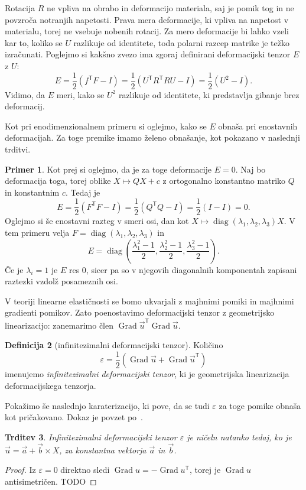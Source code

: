 \documentclass[12pt,a4paper,twoside]{article}
\theoremstyle{definition} %
\newtheorem{definicija}{Definicija}[section]
\newtheorem{primer}[definicija]{Primer}
\theoremstyle{plain} %
\newtheorem{trditev}[definicija]{Trditev}
\numberwithin{equation}{section}
\newcommand{\T}{\mathsf{T}}
\newcommand{\Grad}{\operatorname{Grad}}
\newcommand{\eps}{\varepsilon}
\newcommand{\vu}{\vec{u}}
\newcommand{\va}{\vec{a}}
\newcommand{\vb}{\vec{b}}
\newcommand{\vX}{X}
\DeclareMathOperator{\diag}{diag}
\begin{document}
Rotacija $R$ ne vpliva na obrabo in deformacijo materiala, saj je pomik tog in ne povzroča notranjih
napetosti. Prava mera deformacije, ki vpliva na napetost v materialu, torej ne vsebuje nobenih
rotacij. Za mero deformacije bi lahko vzeli kar to, koliko se $U$ razlikuje od identitete, toda
polarni razcep matrike je težko izračunati. Poglejmo si kakšno zvezo ima zgoraj definirani
deformacijski tenzor $E$ z $U$:
\[
  E = \frac12(f^\T F - I) = \frac12(U^\T R^\T R U - I) = \frac12 (U^2 - I).
\]
Vidimo, da $E$ meri, kako se $U^2$ razlikuje od identitete, ki predstavlja
gibanje brez deformacij.

Kot pri enodimenzionalnem primeru si oglejmo, kako se $E$ obnaša pri enostavnih
deformacijah. Za toge premike imamo želeno obnašanje, kot pokazano v naslednji
trditvi.

\begin{primer}
  Kot prej si oglejmo, da je za toge deformacije $E = 0$.
 Naj bo deformacija toga, torej oblike $\vX \mapsto Q\vX +
c$ z ortogonalno konstantno matriko $Q$ in konstantnim $c$. Tedaj je
\[ E = \frac12 (F^\T F - I) = \frac12(Q^\T Q - I) = \frac12(I - I) = 0. \]
Oglejmo si še enostavni razteg v smeri osi, dan kot
$\vX \mapsto \diag(\lambda_1, \lambda_2, \lambda_3) \vX$.
V tem primeru velja $F = \diag(\lambda_1, \lambda_2, \lambda_3)$ in
  \[
    E = \diag\left(
      \frac{\lambda_1^2-1}{2},
      \frac{\lambda_2^2-1}{2},
      \frac{\lambda_3^2-1}{2}
    \right).
  \]
  Če je $\lambda_i = 1$ je $E$ res 0, sicer pa so v njegovih diagonalnih
  komponentah zapisani raztezki vzdolž posameznih osi.
\end{primer}

V teoriji linearne elastičnosti se bomo ukvarjali z majhnimi pomiki in majhnimi
gradienti pomikov. Zato poenostavimo deformacijski tenzor z geometrijsko
linearizacijo: zanemarimo člen $\Grad \vu^\T \Grad \vu$.

\begin{definicija}[infinitezimalni deformacijski tenzor]
  Količino
  \begin{equation}
    \eps = \frac{1}{2}(\Grad \vu + \Grad \vu^\T)
    \label{eq:eps}
  \end{equation}
  imenujemo \emph{infinitezimalni deformacijski tenzor}, ki je geometrijska
  linearizacija deformacijskega tenzorja.
\end{definicija}

Pokažimo še naslednjo karaterizacijo, ki pove, da se tudi $\eps$ za toge pomike
obnaša kot pričakovano. Dokaz je povzet po~\cite[str.\ 56]{gurtin1982introduction}.
\begin{trditev}
  \label{trd:eps-0}
  Infinitezimalni deformacijski tenzor $\eps$ je ničeln natanko tedaj, ko je
  $\vu = \va + \vb \times \vX$, za konstantna vektorja $\va$ in $\vb$.
\end{trditev}
\begin{proof}
  Iz $\eps = 0$ direktno sledi $\Grad u = -\Grad u^\T$, torej je $\Grad u$ antisimetričen.
  TODO
\end{proof}
\end{document}
